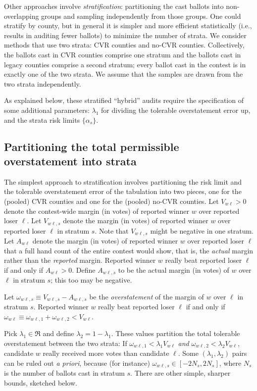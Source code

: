\documentclass[12pt]{article}
\begin{document}
Other approaches involve \emph{stratification}: partitioning the cast ballots
into non-overlapping groups and sampling independently from those groups.
One could stratify by county, but in general it is simpler and more efficient
statistically (i.e., results in auditing fewer ballots) to minimize the number of strata.
We consider methods that use two strata: CVR counties and no-CVR counties. 
Collectively, the ballots cast in CVR counties comprise one stratum and the ballots cast in 
legacy counties comprise a second stratum; every ballot cast in the contest is in 
exactly one of the two strata. 
We assume that the samples are drawn from the
two strata independently.

As explained below, these stratified ``hybrid'' audits require the specification of some additional parameters:
$\lambda_1$ for dividing the tolerable overstatement error up, and the strata risk limits $\{\alpha_s\}$.

\subsection{Partitioning the total permissible overstatement into strata}
The simplest approach to stratification involves partitioning the risk limit and the tolerable
overstatement error of the tabulation into
two pieces, one for the (pooled) CVR counties and one for the (pooled) no-CVR counties.
Let $V_{w\ell} > 0$ denote the contest-wide margin (in votes) of reported winner 
$w$ over reported loser
$\ell$.
Let $V_{w\ell,s}$ denote the margin (in votes) of reported winner $w$ over reported loser $\ell$
in stratum $s$. 
Note that $V_{w\ell,s}$ might be negative in one stratum.
Let $A_{w\ell}$ denote the margin (in votes)
of reported winner $w$ over reported loser $\ell$ that 
a full hand count of the entire contest would show, that is, the \emph{actual} margin rather
than the \emph{reported} margin.
Reported winner $w$ really beat reported loser $\ell$ if and only if $A_{w\ell} > 0$.
Define $A_{w\ell,s}$ to be the actual margin (in votes) of $w$ over $\ell$ in stratum $s$;
this too may be negative.

Let $\omega_{w\ell,s} \equiv V_{w\ell,s} - A_{w\ell,s}$ be the \emph{overstatement}
of the margin of $w$ over $\ell$ in stratum $s$.
Reported winner $w$ really beat reported loser 
$\ell$ if and only if $\omega_{w\ell} \equiv \omega_{w\ell,1} + \omega_{w\ell,2} < V_{w\ell}$.

Pick $\lambda_1 \in \Re$ and define $\lambda_2 = 1-\lambda_1$. These values partition the
total tolerable overstatement between the two strata:
If $\omega_{w\ell,1} < \lambda_1 V_{w\ell}$ \emph{and} 
$\omega_{w\ell,2} < \lambda_2 V_{w\ell}$, candidate $w$ really received more votes
than candidate $\ell$.
Some $(\lambda_1, \lambda_2)$ pairs 
can be ruled out \emph{a priori}, because (for instance) $\omega_{w\ell,s} \in [-2N_s, 2N_s]$,
where $N_s$ is the number of ballots cast in stratum $s$.
There are other simple, sharper bounds, sketched below.
\end{document}
